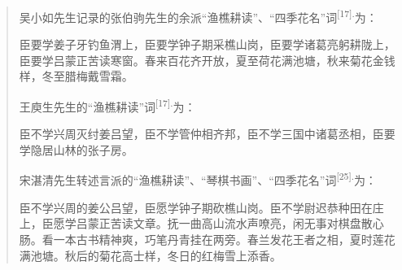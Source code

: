 \begin{enumerate}
  \begin{quote}
  吴小如先生记录的张伯驹先生的余派``渔樵耕读''、``四季花名''词\textsuperscript{{[}17{]}.}为：

  臣要学姜子牙钓鱼渭上，臣要学钟子期采樵山岗，臣要学诸葛亮躬耕陇上，臣要学吕蒙正苦读寒窗。春来百花齐开放，夏至荷花满池塘，秋来菊花金钱样，冬至腊梅戴雪霜。

  王庾生先生的``渔樵耕读''词\textsuperscript{{[}17{]}.}为：

  臣不学兴周灭纣姜吕望，臣不学管仲相齐邦，臣不学三国中诸葛丞相，臣要学隐居山林的张子房。

  宋湛清先生转述言派的``渔樵耕读''、``琴棋书画''、``四季花名''词\textsuperscript{{[}25{]}.}为：

  臣不学兴周的姜公吕望，臣愿学钟子期砍樵山岗。臣不学尉迟恭种田在庄上，臣愿学吕蒙正苦读文章。抚一曲高山流水声嘹亮，闲无事对棋盘散心肠。看一本古书精神爽，巧笔丹青挂在两旁。春兰发花王者之相，夏时莲花满池塘。秋后的菊花高士样，冬日的红梅雪上添香。
  \end{quote}


\end{enumerate}
